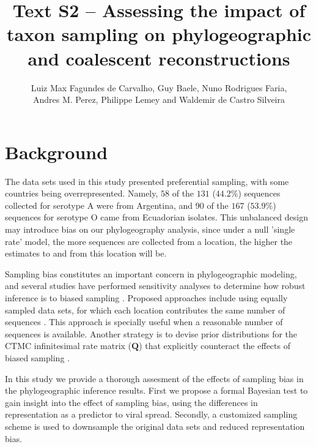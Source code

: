 \documentclass[a4paper,10pt]{article}
\title{Text S2 -- Assessing the impact of taxon sampling on phylogeographic and coalescent reconstructions} %
\author{
Luiz Max Fagundes de Carvalho,
Guy Baele,
Nuno Rodrigues Faria,\\
Andres M. Perez,
Philippe Lemey and
Waldemir de Castro Silveira
\\}
\date{}
\begin{document}
\maketitle

\section{Background}

The data sets used in this study presented preferential sampling, with some countries being overrepresented.
Namely, $58$ of the $131$ ($44.2\%$) sequences collected for serotype A were from Argentina, and $90$ of the $167$ ($53.9\%$) sequences for serotype O came from Ecuadorian isolates.
This unbalanced design may introduce bias on our phylogeography analysis, since under a null 'single rate' model, the more sequences are collected from a location, the higher the estimates to and from this location will be. %

Sampling bias constitutes an important concern in phylogeographic modeling, and several studies have performed sensitivity analyses to determine how robust inference is to biased sampling \cite{Faria2012,Lemey2013,polar,fluPNAS}.
Proposed approaches include using equally sampled data sets, for which each location contributes the same number of sequences \cite{fluPNAS}.
This approach is specially useful when a reasonable number of sequences is available.
Another strategy is to devise prior distributions for the CTMC infinitesimal rate matrix ($\mathbf{Q}$) that explicitly counteract the effects of biased sampling \cite{Faria2012}.


In this study we provide a thorough assesment of the effects of sampling bias in the phylogeographic inference results. 
First we propose a formal Bayesian test to gain insight into the effect of sampling bias, using the differences in representation as a predictor to viral spread.
Secondly, a customized sampling scheme is used to downsample the original data sets and reduced representation bias.
\end{document}
